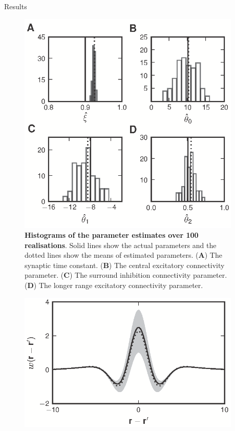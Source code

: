 \documentclass[final]{beamer}
\newlength{\sepwid}
\newlength{\onecolwid}
\begin{document}
\begin{frame}[t]
\begin{columns}[t]
  \begin{column}{\sepwid}\end{column}			%
	\begin{column}{\onecolwid}	

      			  
      \begin{block}{Results}
		\begin{figure}	
		\begin{center}
		  \includegraphics[width=9in, scale = 10]{Figure7.eps}
		\end{center}
		\caption{{\bf Histograms of the parameter estimates over 100
		realisations}. Solid lines show the actual parameters and the dotted lines show the means of estimated parameters. (\textbf{A}) The synaptic time constant. (\textbf{B}) The central excitatory connectivity parameter. (\textbf{C}) The surround inhibition connectivity parameter. (\textbf{D}) The longer range excitatory connectivity parameter.} 
		\label{fig:Figure7}	
		\end{figure}
		\begin{figure}
		\begin{center}
		\includegraphics[width=9in, scale = 10]{Figure8.eps}

\end{center}
\end{figure}
\end{block}
\end{column}
\end{columns}
\end{frame}
\end{document}
